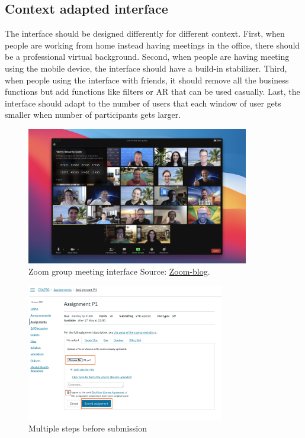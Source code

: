 \documentclass[
	letterpaper, %
]{jdf}
\begin{document}
\subsection{Context adapted interface}
The interface should be designed differently for different context. First, when people are working from home instead having meetings in the office, there should be a professional virtual background. Second, when people are having meeting using the mobile device, the interface should have a build-in stabilizer. Third, when people using the interface with friends, it should remove all the business functions but add functions like filters or AR that can be used casually. Last, the interface should adapt to the number of users that each window of user gets smaller when number of participants gets larger.

\begin{figure}[h]
	\centering
	\includegraphics[height=6cm]{Figures/Zoom-End-to-End.png}
	\caption{Zoom group meeting interface Source: \href{https://blog.zoom.us/zoom-rolling-out-end-to-end-encryption-offering/}{Zoom-blog}.}
	\label{fig:zoom_group}
\end{figure}

\begin{figure}[h]
	\centering
	\includegraphics[height=6cm]{Figures/upload_assignment.jpg}
	\caption{Multiple steps before submission}
	\label{fig:upload_assignment}
\end{figure}
\end{document}
